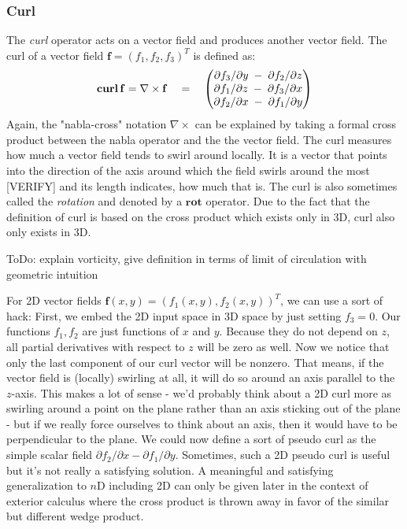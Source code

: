 \subsubsection{Curl}
The \emph{curl} operator acts on a vector field and produces another vector field. The curl of a vector field $\mathbf{f} = (f_1, f_2, f_3)^T$ is defined as:
\begin{equation}
 \operatorname{\mathbf{curl}} \mathbf{f} = \nabla \times \mathbf{f}  \quad = \quad
 \begin{pmatrix}
	\partial f_3 / \partial y \; - \; \partial f_2 / \partial z \\
	\partial f_1 / \partial z \; - \; \partial f_3 / \partial x \\
	\partial f_2 / \partial x \; - \; \partial f_1 / \partial y
\end{pmatrix} 
\end{equation}
Again, the "nabla-cross" notation  $\nabla \times$ can be explained by taking a formal cross product between the nabla operator and the the vector field. The curl measures how much a vector field tends to swirl around locally. It is a vector that points into the direction of the axis around which the field swirls around the most [VERIFY] and its length indicates, how much that is. The curl is also sometimes called the \emph{rotation} and denoted by a $\mathbf{rot}$ operator. Due to the fact that the definition of curl is based on the cross product which exists only in 3D, curl also only exists in 3D. 

ToDo: explain vorticity, give definition in terms of limit of circulation with geometric intuition





\medskip
For 2D vector fields $\mathbf{f}(x,y) = (f_1(x,y), f_2(x,y))^T$, we can use a sort of hack: First, we embed the 2D input space in 3D space by just setting $f_3 = 0$. Our functions $f_1, f_2$ are just functions of $x$ and $y$.  Because they do not depend on $z$, all partial derivatives with respect to $z$ will be zero as well. Now we notice that only the last component of our curl vector will be nonzero. That means, if the vector field is (locally) swirling at all, it will do so around an axis parallel to the $z$-axis. This makes a lot of sense - we'd probably think about a 2D curl more as swirling around a point on the plane rather than an axis sticking out of the plane - but if we really force ourselves to think about an axis, then it would have to be perpendicular to the plane. We could now define a sort of pseudo curl as the simple scalar field $\partial f_2 / \partial x - \partial f_1 / \partial y$. Sometimes, such a 2D pseudo curl is useful but it's not really a satisfying solution. A meaningful and satisfying generalization to $n$D including 2D can only be given later in the context of exterior calculus where the cross product is thrown away in favor of the similar but different wedge product. 

